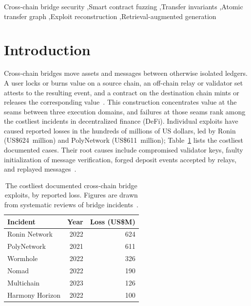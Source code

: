 \documentclass[a4paper]{cas-sc}
\newcommand{\hd}[1]{{\bfseries\boldmath #1}}
\begin{document}
\begin{keywords}
Cross-chain bridge security \sep Smart contract fuzzing \sep Transfer invariants \sep Atomic transfer graph \sep Exploit reconstruction \sep Retrieval-augmented generation
\end{keywords}

{\hfuzz=120pt\maketitle}
\suppressfloats[t]

\section{Introduction}\label{sec:intro}

Cross-chain bridges move assets and messages between otherwise isolated ledgers. A user locks or burns value on a source chain, an off-chain relay or validator set attests to the resulting event, and a contract on the destination chain mints or releases the corresponding value~\citep{belchior2021survey, augusto2024sok}. This construction concentrates value at the seams between three execution domains, and failures at those seams rank among the costliest incidents in decentralized finance (DeFi). Individual exploits have caused reported losses in the hundreds of millions of US dollars, led by Ronin (US\$624~million) and PolyNetwork (US\$611~million); Table~\ref{tab:losses} lists the costliest documented cases. Their root causes include compromised validator keys, faulty initialization of message verification, forged deposit events accepted by relays, and replayed messages~\citep{lee2023sok, duan2023attacks, liao2024smartaxe}.

\begin{table}[pos=htbp,belowcap=4pt]
\centering
\caption{The costliest documented cross-chain bridge exploits, by reported loss. Figures are drawn from systematic reviews of bridge incidents~\citep{lee2023sok, augusto2024sok, zhang2024bridgesok}.}
\label{tab:losses}
\footnotesize
\begin{tabular*}{\linewidth}{@{\extracolsep{\fill}}lrr@{}}
\toprule
\hd{Incident} & \hd{Year} & \hd{Loss (US\$M)} \\
\midrule
Ronin Network   & 2022 & 624 \\
PolyNetwork     & 2021 & 611 \\
Wormhole        & 2022 & 326 \\
Nomad           & 2022 & 190 \\
Multichain      & 2023 & 126 \\
Harmony Horizon & 2022 & 100 \\
\bottomrule
\end{tabular*}
\end{table}
\end{document}
